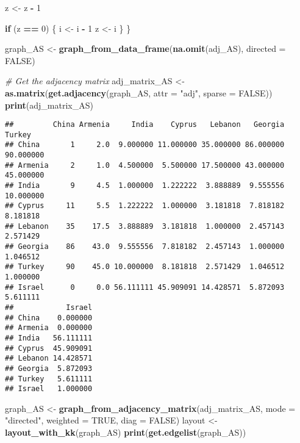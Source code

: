 \documentclass[
]{article}
\newenvironment{Shaded}{\begin{snugshade}}{\end{snugshade}}
\newcommand{\AttributeTok}[1]{\textcolor[rgb]{0.13,0.29,0.53}{#1}}
\newcommand{\CommentTok}[1]{\textcolor[rgb]{0.56,0.35,0.01}{\textit{#1}}}
\newcommand{\ConstantTok}[1]{\textcolor[rgb]{0.56,0.35,0.01}{#1}}
\newcommand{\ControlFlowTok}[1]{\textcolor[rgb]{0.13,0.29,0.53}{\textbf{#1}}}
\newcommand{\DecValTok}[1]{\textcolor[rgb]{0.00,0.00,0.81}{#1}}
\newcommand{\FunctionTok}[1]{\textcolor[rgb]{0.13,0.29,0.53}{\textbf{#1}}}
\newcommand{\NormalTok}[1]{#1}
\newcommand{\OtherTok}[1]{\textcolor[rgb]{0.56,0.35,0.01}{#1}}
\newcommand{\SpecialCharTok}[1]{\textcolor[rgb]{0.81,0.36,0.00}{\textbf{#1}}}
\newcommand{\StringTok}[1]{\textcolor[rgb]{0.31,0.60,0.02}{#1}}
\begin{document}
\begin{Shaded}
\begin{Highlighting}[]
\NormalTok{  z }\OtherTok{\textless{}{-}}\NormalTok{ z }\SpecialCharTok{{-}} \DecValTok{1}

  \ControlFlowTok{if}\NormalTok{ (z }\SpecialCharTok{==} \DecValTok{0}\NormalTok{) \{}
\NormalTok{    i }\OtherTok{\textless{}{-}}\NormalTok{ i }\SpecialCharTok{{-}} \DecValTok{1}
\NormalTok{    z }\OtherTok{\textless{}{-}}\NormalTok{ i}
\NormalTok{  \}}
\NormalTok{\}}

\NormalTok{graph\_AS }\OtherTok{\textless{}{-}} \FunctionTok{graph\_from\_data\_frame}\NormalTok{(}\FunctionTok{na.omit}\NormalTok{(adj\_AS), }\AttributeTok{directed =} \ConstantTok{FALSE}\NormalTok{)}

\CommentTok{\# Get the adjacency matrix}
\NormalTok{adj\_matrix\_AS }\OtherTok{\textless{}{-}} \FunctionTok{as.matrix}\NormalTok{(}\FunctionTok{get.adjacency}\NormalTok{(graph\_AS, }\AttributeTok{attr =} \StringTok{"adj"}\NormalTok{, }\AttributeTok{sparse =} \ConstantTok{FALSE}\NormalTok{))}
\FunctionTok{print}\NormalTok{(adj\_matrix\_AS)}
\end{Highlighting}
\end{Shaded}

\begin{verbatim}
##         China Armenia     India    Cyprus   Lebanon   Georgia    Turkey
## China       1     2.0  9.000000 11.000000 35.000000 86.000000 90.000000
## Armenia     2     1.0  4.500000  5.500000 17.500000 43.000000 45.000000
## India       9     4.5  1.000000  1.222222  3.888889  9.555556 10.000000
## Cyprus     11     5.5  1.222222  1.000000  3.181818  7.818182  8.181818
## Lebanon    35    17.5  3.888889  3.181818  1.000000  2.457143  2.571429
## Georgia    86    43.0  9.555556  7.818182  2.457143  1.000000  1.046512
## Turkey     90    45.0 10.000000  8.181818  2.571429  1.046512  1.000000
## Israel      0     0.0 56.111111 45.909091 14.428571  5.872093  5.611111
##            Israel
## China    0.000000
## Armenia  0.000000
## India   56.111111
## Cyprus  45.909091
## Lebanon 14.428571
## Georgia  5.872093
## Turkey   5.611111
## Israel   1.000000
\end{verbatim}

\begin{Shaded}
\begin{Highlighting}[]
\NormalTok{graph\_AS }\OtherTok{\textless{}{-}} \FunctionTok{graph\_from\_adjacency\_matrix}\NormalTok{(adj\_matrix\_AS, }\AttributeTok{mode =} \StringTok{"directed"}\NormalTok{, }\AttributeTok{weighted =} \ConstantTok{TRUE}\NormalTok{, }\AttributeTok{diag =} \ConstantTok{FALSE}\NormalTok{)}
\NormalTok{layout }\OtherTok{\textless{}{-}} \FunctionTok{layout\_with\_kk}\NormalTok{(graph\_AS)}
\FunctionTok{print}\NormalTok{(}\FunctionTok{get.edgelist}\NormalTok{(graph\_AS))}
\end{Highlighting}
\end{Shaded}
\end{document}
